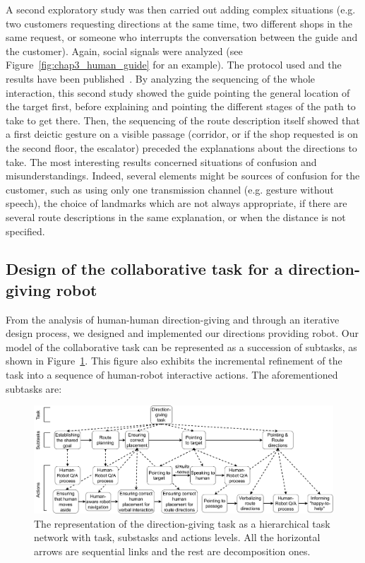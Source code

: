 \documentclass[a4paper,11pt,twoside]{StyleThese}
\begin{document}
A second exploratory study was then carried out adding complex situations (e.g. two customers requesting directions at the same time, two different shops in the same request, or someone who interrupts the conversation between the guide and the customer). Again, social signals were analyzed (see Figure~\ref{fig:chap3_human_guide} for an example). The protocol used and the results have been published~\cite{heikkilae_2018,heikkilae_2019_should}. By analyzing the sequencing of the whole interaction, this second study showed the guide pointing the general location of the target first, before explaining and pointing the different stages of the path to take to get there. Then, the sequencing of the route description itself showed that a first deictic gesture on a visible passage (corridor, or if the shop requested is on the second floor, the escalator) preceded the explanations about the directions to take. The most interesting results concerned situations of confusion and misunderstandings. Indeed, several elements might be sources of confusion for the customer, such as using only one transmission channel (e.g. gesture without speech), the choice of landmarks which are not always appropriate, if there are several route descriptions in the same explanation, or when the distance is not specified. 

\subsection{Design of the collaborative task for a direction-giving robot}\label{sec:guiding}

From the analysis of human-human direction-giving and through an iterative design process, we designed and implemented our directions providing robot. Our model of the collaborative task can be represented as a succession of subtasks, as shown in Figure~\ref{fig:chap3_HTN}. This figure also exhibits the incremental refinement of the task into a sequence of human-robot interactive actions. The aforementioned subtasks are:

\begin{figure}[!t]
	\centering
	\includegraphics[width=\linewidth]{figures/chapter3/HTN-guiding_task.pdf}
	\caption{The representation of the direction-giving task as a hierarchical task network with task, substasks and actions levels. All the horizontal arrows are sequential links and the rest are decomposition ones.}
	\label{fig:chap3_HTN}
\end{figure}
\end{document}
